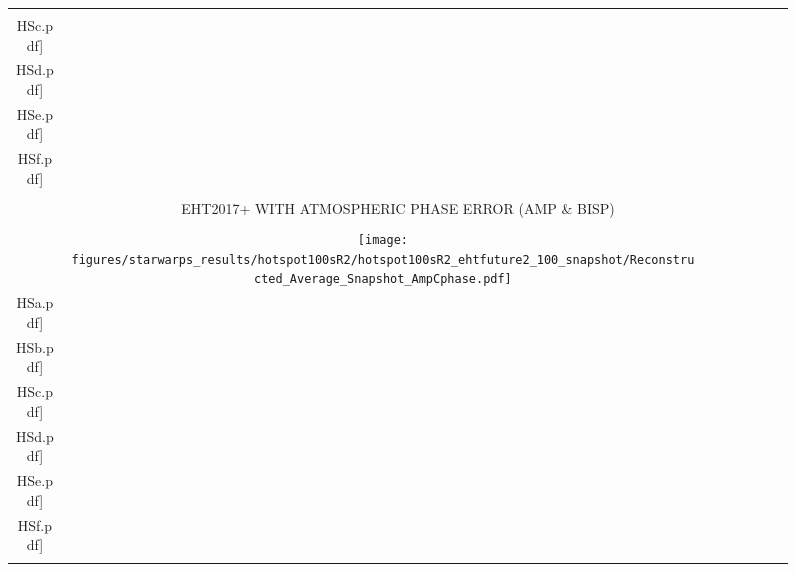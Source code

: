\begin{figure}
\begin{center}
\begin{tabular}{  c | c | c  c  c  c  c c }
			\texttt{[image: figures/starwarps\_results/hotspot100sR2/ehtfuture2\_100\_visibility/best/frames/mean\_noaxis\_\\HSc.pdf]} &
			\texttt{[image: figures/starwarps\_results/hotspot100sR2/ehtfuture2\_100\_visibility/best/frames/mean\_noaxis\_\\HSd.pdf]} &
			\texttt{[image: figures/starwarps\_results/hotspot100sR2/ehtfuture2\_100\_visibility/best/frames/mean\_noaxis\_\\HSe.pdf]} &
			\texttt{[image: figures/starwarps\_results/hotspot100sR2/ehtfuture2\_100\_visibility/best/frames/mean\_noaxis\_\\HSf.pdf]} 
			\\ \hline  	
			&\vspace{-.1in} &&&&&&\\
			\multicolumn{8}{c}{  \large{\textsf{EHT2017+ WITH ATMOSPHERIC PHASE ERROR (AMP \& BISP) }}  }
			\\ \hline
			&\vspace{-.1in} &&&&&&\\
			\multirow{1}{*}[.5in]{ \rotatebox[origin=t]{90}{\small{\textsf{Snapshot}} }}
			&
			{{\texttt{[image: figures/starwarps\_results/hotspot100sR2/hotspot100sR2\_ehtfuture2\_100\_snapshot/Reconstructed\_Average\_Snapshot\_AmpCphase.pdf]}} } &
			\texttt{[image: figures/starwarps\_results/hotspot100sR2/hotspot100sR2\_ehtfuture2\_100\_snapshot/Reconstructed\_Snapshot\_AmpCphase\_\\HSa.pdf]} &
			\texttt{[image: figures/starwarps\_results/hotspot100sR2/hotspot100sR2\_ehtfuture2\_100\_snapshot/Reconstructed\_Snapshot\_AmpCphase\_\\HSb.pdf]} &
			\texttt{[image: figures/starwarps\_results/hotspot100sR2/hotspot100sR2\_ehtfuture2\_100\_snapshot/Reconstructed\_Snapshot\_AmpCphase\_\\HSc.pdf]} &
			\texttt{[image: figures/starwarps\_results/hotspot100sR2/hotspot100sR2\_ehtfuture2\_100\_snapshot/Reconstructed\_Snapshot\_AmpCphase\_\\HSd.pdf]} &
			\texttt{[image: figures/starwarps\_results/hotspot100sR2/hotspot100sR2\_ehtfuture2\_100\_snapshot/Reconstructed\_Snapshot\_AmpCphase\_\\HSe.pdf]} &
			\texttt{[image: figures/starwarps\_results/hotspot100sR2/hotspot100sR2\_ehtfuture2\_100\_snapshot/Reconstructed\_Snapshot\_AmpCphase\_\\HSf.pdf]}  \\
			&\vspace{-.1in} &&&&&&\\

\end{tabular}
\end{center}
\end{figure}
